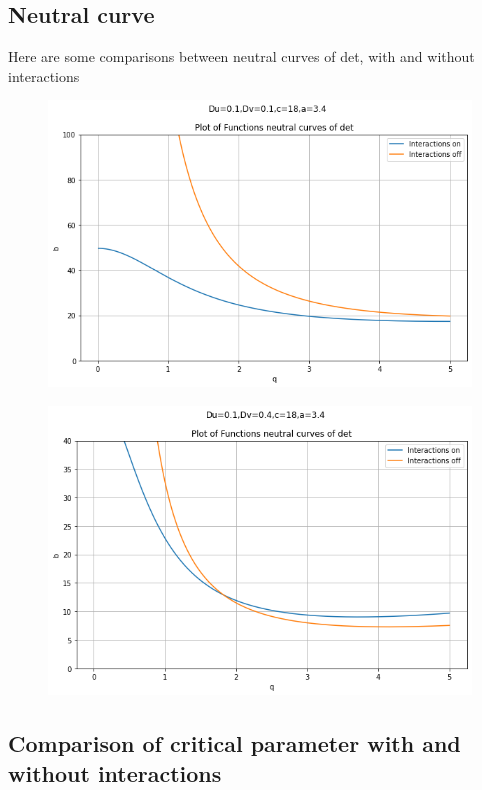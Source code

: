 \documentclass{article}
\begin{document}
\subsection{Neutral curve}
Here are some comparisons between neutral curves of det, with and without interactions
\begin{figure}[H]
\includegraphics[width=\textwidth]{images/plot_20240719_111506.png} 

\end{figure}
\begin{figure}[H]
\includegraphics[width=\textwidth]{images/plot_20240719_112606.png} 

\end{figure}

\subsection*{Comparison of critical parameter with and without interactions}
\end{document}
